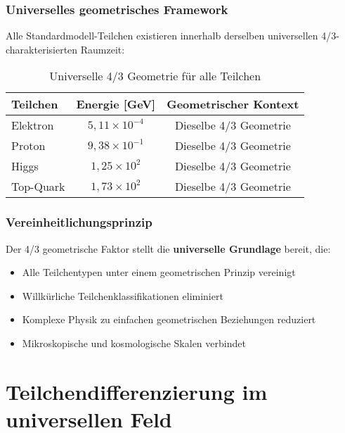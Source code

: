 \documentclass[12pt,a4paper]{article}
\newcommand{\mytimes}{\ensuremath{\times}}
\begin{document}
	\subsubsection{Universelles geometrisches Framework}
	\label{subsubsec:universelles_framework}
	
	Alle Standardmodell-Teilchen existieren innerhalb derselben universellen 4/3-charakterisierten Raumzeit:
	
	\begin{table}[htbp]
		\centering
		\begin{tabular}{lcc}
			\toprule
			\textbf{Teilchen} & \textbf{Energie [GeV]} & \textbf{Geometrischer Kontext} \\
			\midrule
			Elektron & $5,11 \mytimes 10^{-4}$ & Dieselbe 4/3 Geometrie \\
			Proton & $9,38 \mytimes 10^{-1}$ & Dieselbe 4/3 Geometrie \\
			Higgs & $1,25 \mytimes 10^{2}$ & Dieselbe 4/3 Geometrie \\
			Top-Quark & $1,73 \mytimes 10^{2}$ & Dieselbe 4/3 Geometrie \\
			\bottomrule
		\end{tabular}
		\caption{Universelle 4/3 Geometrie für alle Teilchen}
		\label{tab:universelle_geometrie}
	\end{table}
	
	\subsubsection{Vereinheitlichungsprinzip}
	\label{subsubsec:vereinheitlichungsprinzip}
	
	Der 4/3 geometrische Faktor stellt die \textbf{universelle Grundlage} bereit, die:
	\begin{itemize}
		\item Alle Teilchentypen unter einem geometrischen Prinzip vereinigt
		\item Willkürliche Teilchenklassifikationen eliminiert
		\item Komplexe Physik zu einfachen geometrischen Beziehungen reduziert
		\item Mikroskopische und kosmologische Skalen verbindet
	\end{itemize}
	
	\section{Teilchendifferenzierung im universellen Feld}
	\label{sec:teilchendifferenzierung}
	
\end{document}
